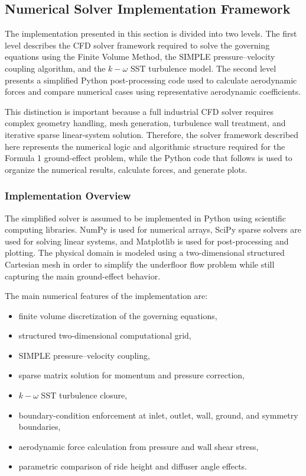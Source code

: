 \documentclass[12pt,a4paper]{article}
\begin{document}
\subsection{Numerical Solver Implementation Framework}

The implementation presented in this section is divided into two levels. The first level
describes the CFD solver framework required to solve the governing equations using the
Finite Volume Method, the SIMPLE pressure--velocity coupling algorithm, and the
$k-\omega$ SST turbulence model. The second level presents a simplified Python
post-processing code used to calculate aerodynamic forces and compare numerical cases
using representative aerodynamic coefficients.

This distinction is important because a full industrial CFD solver requires complex
geometry handling, mesh generation, turbulence wall treatment, and iterative sparse
linear-system solution. Therefore, the solver framework described here represents the
numerical logic and algorithmic structure required for the Formula 1 ground-effect
problem, while the Python code that follows is used to organize the numerical results,
calculate forces, and generate plots.

\subsubsection{Implementation Overview}

The simplified solver is assumed to be implemented in Python using scientific computing
libraries. NumPy is used for numerical arrays, SciPy sparse solvers are used for solving
linear systems, and Matplotlib is used for post-processing and plotting. The physical
domain is modeled using a two-dimensional structured Cartesian mesh in order to simplify
the underfloor flow problem while still capturing the main ground-effect behavior.

The main numerical features of the implementation are:

\begin{itemize}
    \item finite volume discretization of the governing equations,
    \item structured two-dimensional computational grid,
    \item SIMPLE pressure--velocity coupling,
    \item sparse matrix solution for momentum and pressure correction,
    \item $k-\omega$ SST turbulence closure,
    \item boundary-condition enforcement at inlet, outlet, wall, ground, and symmetry boundaries,
    \item aerodynamic force calculation from pressure and wall shear stress,
    \item parametric comparison of ride height and diffuser angle effects.
\end{itemize}
\end{document}

